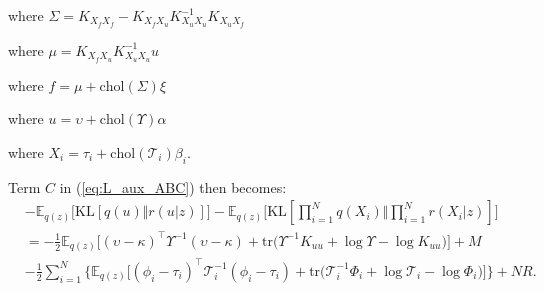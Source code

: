 \documentclass[12pt]{article}
\newcommand{\Tau}{\mathcal{T}}
\newcommand{\Kff}{K_{X_fX_f}}
\newcommand{\Kuu}{K_{X_uX_u}}
\newcommand{\Kuf}{K_{X_uX_f}}
\newcommand{\Kfu}{K_{X_fX_u}}
\newcommand{\chol}{\mathrm{chol}}
\begin{document}
where $\Sigma = \Kff - \Kfu\Kuu^{-1}\Kuf$

where $\mu   = \Kfu\Kuu^{-1}u$

where $f = \mu + \chol(\Sigma)\xi $

where $u = \upsilon + \chol(\Upsilon)\alpha$

where $X_i = \tau_i + \chol(\Tau_i)\beta_i$.

Term $C$ in (\ref{eq:L_aux_ABC}) then becomes:
%
\begin{align}
    &-\mathbb{E}_{q(z)}\big[ \text{KL}[q(u)\Vert r(u|z)] \big] - \mathbb{E}_{q(z)}\big[ \text{KL}[\prod_{i=1}^Nq(X_i)\Vert \prod_{i=1}^Nr(X_i|z)] \big]\\
    &= -\frac{1}{2}\mathbb{E}_{q(z)}\big[ (\upsilon - \kappa)^\top\Upsilon^{-1}(\upsilon - \kappa) + \text{tr}\big( \Upsilon^{-1}K_{uu} + \log\Upsilon - \log K_{uu} \big) \big] + M\\
    &-\frac{1}{2}\sum_{i=1}^N \big\{ \mathbb{E}_{q(z)}\big[ (\phi_i - \tau_i)^\top\Tau_i^{-1}(\phi_i - \tau_i) + \text{tr}\big( \Tau_i^{-1}\Phi_i + \log\Tau_i - \log\Phi_i \big) \big] \big\} + NR.
\end{align}
\end{document}

